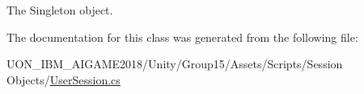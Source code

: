 The Singleton object. 



The documentation for this class was generated from the following file\+:\begin{DoxyCompactItemize}
\item 
U\+O\+N\+\_\+\+I\+B\+M\+\_\+\+A\+I\+G\+A\+M\+E2018/\+Unity/\+Group15/\+Assets/\+Scripts/\+Session Objects/\mbox{\hyperlink{_user_session_8cs}{User\+Session.\+cs}}\end{DoxyCompactItemize}

